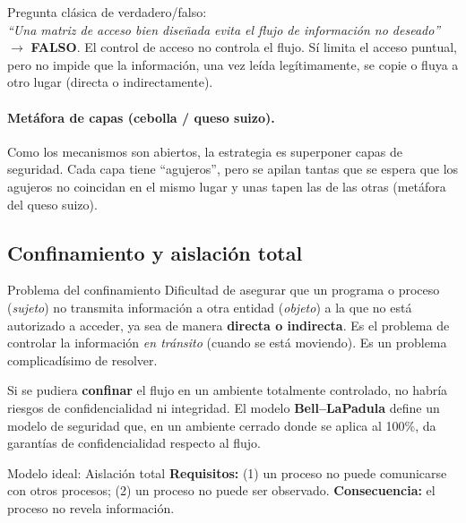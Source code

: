 \documentclass[../main.tex]{subfiles}
\begin{document}
\begin{examen}
Pregunta clásica de verdadero/falso:\\
\textit{``Una matriz de acceso bien diseñada evita el flujo de información no
deseado''} $\rightarrow$ \textbf{FALSO}. El control de acceso no controla el
flujo. Sí limita el acceso puntual, pero no impide que la información, una vez
leída legítimamente, se copie o fluya a otro lugar (directa o indirectamente).
\end{examen}

\paragraph{Metáfora de capas (cebolla / queso suizo).} Como los mecanismos son
abiertos, la estrategia es superponer capas de seguridad. Cada capa tiene
``agujeros'', pero se apilan tantas que se espera que los agujeros no coincidan
en el mismo lugar y unas tapen las de las otras (metáfora del queso suizo).

\subsection{Confinamiento y aislación total}

\begin{definicion}{Problema del confinamiento}
Dificultad de asegurar que un programa o proceso (\emph{sujeto}) no transmita
información a otra entidad (\emph{objeto}) a la que no está autorizado a acceder,
ya sea de manera \textbf{directa o indirecta}. Es el problema de controlar la
información \emph{en tránsito} (cuando se está moviendo). Es un problema
complicadísimo de resolver.
\end{definicion}

Si se pudiera \textbf{confinar} el flujo en un ambiente totalmente controlado, no
habría riesgos de confidencialidad ni integridad. El modelo \textbf{Bell--LaPadula}
define un modelo de seguridad que, en un ambiente cerrado donde se aplica al 100\%,
da garantías de confidencialidad respecto al flujo.

\begin{definicion}{Modelo ideal: Aislación total}
\textbf{Requisitos:} (1) un proceso no puede comunicarse con otros procesos;
(2) un proceso no puede ser observado. \textbf{Consecuencia:} el proceso no revela
información.
\end{definicion}
\end{document}
